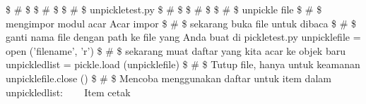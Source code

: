  \$  \#  \$ \$  \#  \$ \$  \#  \$ unpickletest.py 
 \$  \#  \$ \$  \#  \$ \$  \#  \$ unpickle file 
 \$  \#  \$ mengimpor modul acar 
Acar impor 
 \$  \#  \$ sekarang buka file untuk dibaca 
 \$  \#  \$ ganti nama file dengan path ke file yang Anda buat di pickletest.py 
unpicklefile = open ('filename', 'r') 
 \$  \#  \$ sekarang muat daftar yang kita acar ke objek baru 
unpickledlist = pickle.load (unpicklefile) 
 \$  \#  \$ Tutup file, hanya untuk keamanan  
unpicklefile.close () 
 \$  \#  \$ Mencoba menggunakan daftar
untuk item dalam unpickledlist: 
~~~ Item cetak 
